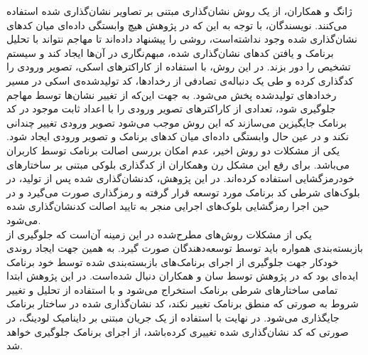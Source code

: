 ژانگ و همکاران، از یک روش نشان‌گذاری مبتنی بر تصاویر نشان‌گذاری شده استفاده می‌کنند. نویسندگان، با توجه به این که در پژوهش هیچ وابستگی داده‌ای میان کد‌های نشان‌گذاری شده وجود نداشته‌است، روشی را پیشنهاد داده‌اند تا مهاجم نتواند با تحلیل برنامک‌ و یافتن کد‌های نشان‌گذاری شده، مبهم‌نگاری در آن‌ها ایجاد کند و سیستم تشخیص را دور بزند. در این روش، با استفاده از کاراکتر‌های اسکی، تصویر ورودی را کدگذاری کرده و طی یک دنباله‌ی تصادفی از رخداد‌ها، کد تولید‌شده‌ی اسکی در مسیر رخداد‌های تولید‌شده پخش می‌شود. به جهت این‌که از تغییر نشان‌ها توسط مهاجم جلوگیری شود، تعدادی از کاراکتر‌های تصویر ورودی را با اعداد ثابت موجود در کد برنامک جایگیزین می‌سازند که این روش موجب می‌شود تصویر ورودی تغییر چندانی نکند و در عین حال وابستگی داده‌ای میان کد‌های برنامک و تصویر ورودی ایجاد شود. یکی از مشکلات دو روش اخیر، عدم امکان بررسی اصالت برنامک توسط کاربران می‌باشد. برای رفع این مشکل رن وهمکاران از کد‌گذاری بلوکی مبتنی بر ساختار‌های خود‌رمزگشایی استفاده کرده‌اند. در این پژوهش، کدنشان‌گذاری شده پس از تولید، در بلوک‌های شرطی کد برنامک مورد توسعه قرار گرفته و رمز‌گذاری صورت می‌گیرد و در حین اجرا رمز‌گشایی بلوک‌های اجرایی منجر به تایید اصالت کدنشان‌گذاری شده می‌شود.\\
یکی از مشکلات روش‌های مطرح‌شده در این زمینه‌ آن‌است که جلوگیری از بازبسته‌بندی همواره باید توسط توسعه‌دهندگان صورت گیرد. به همین جهت ایجاد روندی خودکار جهت جلوگیری از اجرای برنامک‌های بازبسته‌بندی شده توسط خود برنامک ایده‌ای بود که در پژوهش توسط سان و همکاران دنبال  شده‌است. در این پژوهش ابتدا تمامی ساختار‌های شرطی برنامک استخراج می‌شود و با استفاده از تحلیل و تغییر شروط به صورتی که منطق برنامک تغییر نکند، کد نشان‌گذاری شده در ساختار برنامک جایگذاری می‌شود. در نهایت با استفاده از یک جریان مبتنی بر داینامیک لودینگ، در صورتی که کد نشان‌گذاری شده تغییری کرده‌باشد، از اجرای برنامک جلوگیری خواهد شد.
\\
